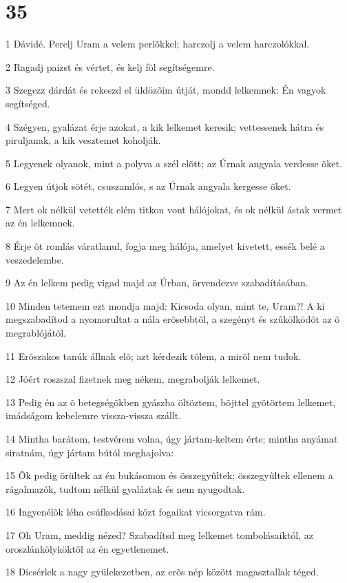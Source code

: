 \chapter{35}

\par 1 Dávidé. Perelj Uram a velem perlõkkel; harczolj a velem harczolókkal.
\par 2 Ragadj paizst és vértet, és kelj föl segítségemre.
\par 3 Szegezz dárdát és rekeszd el üldözõim útját, mondd lelkemnek: Én vagyok segítséged.
\par 4 Szégyen, gyalázat érje azokat, a kik lelkemet keresik; vettessenek hátra és piruljanak, a kik vesztemet koholják.
\par 5 Legyenek olyanok, mint a polyva a szél elõtt; az Úrnak angyala verdesse õket.
\par 6 Legyen útjok sötét, csuszamlós, s az Úrnak angyala kergesse õket.
\par 7 Mert ok nélkül vetették elém titkon vont hálójokat, és ok nélkül ástak vermet az én lelkemnek.
\par 8 Érje õt romlás váratlanul, fogja meg hálója, amelyet kivetett, essék belé a veszedelembe.
\par 9 Az én lelkem pedig vigad majd az Úrban, örvendezve szabadításában.
\par 10 Minden tetemem ezt mondja majd: Kicsoda olyan, mint te, Uram?! A ki megszabadítod a nyomorultat a nála erõsebbtõl, a szegényt és szûkölködõt az õ megrablójától.
\par 11 Erõszakos tanúk állnak elõ; azt kérdezik tõlem, a mirõl nem tudok.
\par 12 Jóért roszszal fizetnek meg nékem, megrabolják lelkemet.
\par 13 Pedig én az õ betegségökben gyászba öltöztem, bõjttel gyötörtem lelkemet, imádságom kebelemre vissza-vissza szállt.
\par 14 Mintha barátom, testvérem volna, úgy jártam-keltem érte; mintha anyámat siratnám, úgy jártam bútól meghajolva:
\par 15 Õk pedig örültek az én bukásomon és összegyûltek; összegyûltek ellenem a rágalmazók, tudtom nélkül gyaláztak és nem nyugodtak.
\par 16 Ingyenélõk léha csúfkodásai közt fogaikat vicsorgatva rám.
\par 17 Oh Uram, meddig nézed? Szabadítsd meg lelkemet tombolásaiktól, az oroszlánkölyköktõl az én egyetlenemet.
\par 18 Dicsérlek a nagy gyülekezetben, az erõs nép között magasztallak téged.
